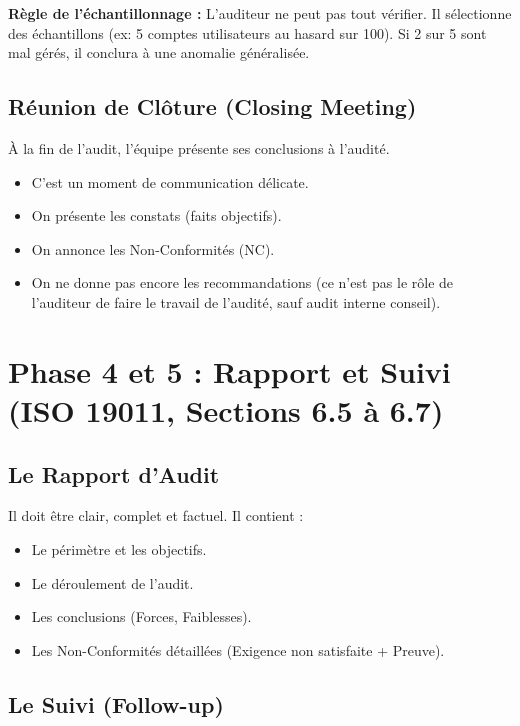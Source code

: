 \begin{boxalert}
\textbf{Règle de l'échantillonnage :} L'auditeur ne peut pas tout vérifier. Il sélectionne des échantillons (ex: 5 comptes utilisateurs au hasard sur 100). Si 2 sur 5 sont mal gérés, il conclura à une anomalie généralisée.
\end{boxalert}

\subsection{Réunion de Clôture (Closing Meeting)}

À la fin de l'audit, l'équipe présente ses conclusions à l'audité.
\begin{itemize}
    \item C'est un moment de communication délicate.
    \item On présente les constats (faits objectifs).
    \item On annonce les Non-Conformités (NC).
    \item On ne donne pas encore les recommandations (ce n'est pas le rôle de l'auditeur de faire le travail de l'audité, sauf audit interne conseil).
\end{itemize}

\section{Phase 4 et 5 : Rapport et Suivi (ISO 19011, Sections 6.5 à 6.7)}

\subsection{Le Rapport d'Audit}

Il doit être clair, complet et factuel. Il contient :
\begin{itemize}
    \item Le périmètre et les objectifs.
    \item Le déroulement de l'audit.
    \item Les conclusions (Forces, Faiblesses).
    \item Les Non-Conformités détaillées (Exigence non satisfaite + Preuve).
\end{itemize}

\subsection{Le Suivi (Follow-up)}

